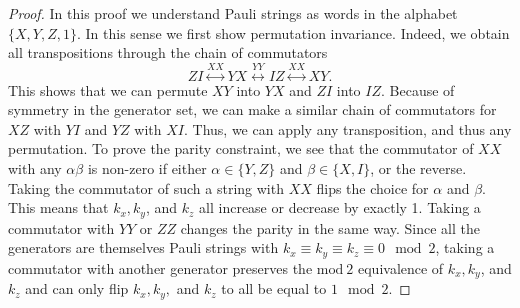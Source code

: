 \documentclass[12pt, a4-paper]{amsart}
\numberwithin{equation}{section}
\begin{document}
\begin{proof} In this proof we understand Pauli strings as words in the alphabet $\{X,Y,Z,1\}$. In this sense we first show permutation invariance. Indeed, we obtain all transpositions through the chain of commutators
    \begin{equation}
        ZI \stackrel{XX}{\longleftrightarrow} YX \stackrel{YY}{\longleftrightarrow} IZ \stackrel{XX}{\longleftrightarrow} XY.
    \end{equation}
    This shows that we can permute $XY$ into $YX$ and $ZI$ into $IZ$. Because of symmetry in the generator set, we can make a similar chain of commutators for $XZ$ with $YI$ and $YZ$ with $XI$. Thus, we can apply any transposition, and thus any permutation.
    To prove the parity constraint, we see that the commutator of $XX$ with any $\alpha \beta$ is non-zero if either $\alpha \in \{Y, Z\}$ and $\beta \in \{X,I\}$, or the reverse. Taking the commutator of such a string with $XX$ flips the choice for $\alpha$ and $\beta$. This means that $k_x, k_y$, and $k_z$ all increase or decrease by exactly 1. Taking a commutator with $YY$ or $ZZ$ changes the parity in the same way. Since all the generators are themselves Pauli strings with $k_x \equiv k_y \equiv k_z \equiv 0 \mod{2}$, taking a commutator with another generator preserves the $\mathrm{mod}\: 2$ equivalence of $k_x, k_y$, and $k_z$ and can only flip $k_x, k_y,$ and $k_z$ to all be equal to $1 \mod{2}$.


\end{proof}
\end{document}
